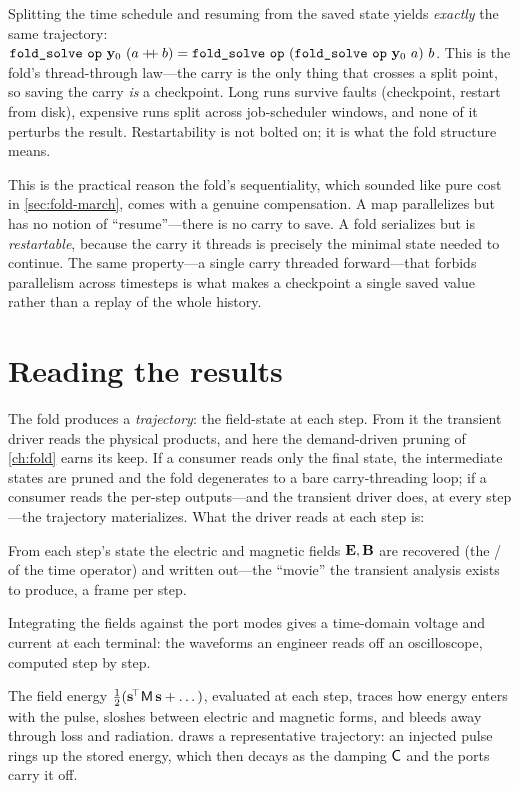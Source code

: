 \begin{keyidea}
Splitting the time schedule and resuming from the saved state yields \emph{exactly}
the same trajectory: $\code{fold\_solve}\ \code{op}\ \vy_0\ (a\mathbin{+\!\!+}b) =
\code{fold\_solve}\ \code{op}\ (\code{fold\_solve}\ \code{op}\ \vy_0\ a)\ b$. This
is the fold's thread-through law---the carry is the only thing that crosses a split
point, so saving the carry \emph{is} a checkpoint. Long runs survive faults
(checkpoint, restart from disk), expensive runs split across job-scheduler windows,
and none of it perturbs the result. Restartability is not bolted on; it is what the
fold structure means.
\end{keyidea}

This is the practical reason the fold's sequentiality, which sounded like pure cost
in \cref{sec:fold-march}, comes with a genuine compensation. A map parallelizes but
has no notion of ``resume''---there is no carry to save. A fold serializes but is
\emph{restartable}, because the carry it threads is precisely the minimal state
needed to continue. The same property---a single carry threaded forward---that
forbids parallelism across timesteps is what makes a checkpoint a single saved
value rather than a replay of the whole history.

\section{Reading the results}
\label{sec:time-readout}

The fold produces a \emph{trajectory}: the field-state at each step. From it the
transient driver reads the physical products, and here the demand-driven pruning of
\cref{ch:fold} earns its keep. If a consumer reads only the final state, the
intermediate states are pruned and the fold degenerates to a bare carry-threading
loop; if a consumer reads the per-step outputs---and the transient driver does, at
every step---the trajectory materializes. What the driver reads at each step is:

\begin{description}[style=nextline, leftmargin=0pt, font=\normalfont\itshape]
  \item[The field trajectory.] From each step's state the electric and magnetic
  fields $\mathbf{E}, \mathbf{B}$ are recovered (the / of the time
  operator) and written out---the ``movie'' the transient analysis exists to
  produce, a frame per step.
  \item[Port voltages and currents.] Integrating the fields against the port modes
  gives a time-domain voltage and current at each terminal: the waveforms an
  engineer reads off an oscilloscope, computed step by step.
  \item[Energy versus time.] The field energy
  $\tfrac12(\mathbf{s}^{\!\top}\mathsf{M}\,\mathbf{s} + \dots)$, evaluated at each step, traces how
  energy enters with the pulse, sloshes between electric and magnetic forms, and
  bleeds away through loss and radiation.  draws a representative
  trajectory: an injected pulse rings up the stored energy, which then decays as
  the damping $\mathsf{C}$ and the ports carry it off.
\end{description}

